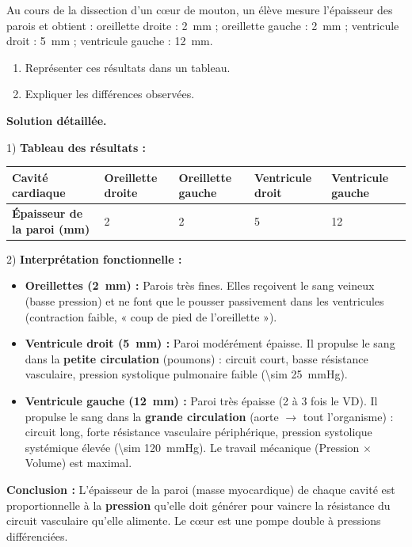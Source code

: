 \documentclass[11pt]{article}
\begin{document}
\begin{exoresolu}
Au cours de la dissection d'un cœur de mouton, un élève mesure l'épaisseur des parois et obtient : oreillette droite : \SI{2}{mm} ; oreillette gauche : \SI{2}{mm} ; ventricule droit : \SI{5}{mm} ; ventricule gauche : \SI{12}{mm}.
\begin{enumerate}
\item Représenter ces résultats dans un tableau.
\item Expliquer les différences observées.
\end{enumerate}
\tcblower
\textbf{Solution détaillée.}

1) \textbf{Tableau des résultats :}
\begin{center}
\begin{tabularx}{\linewidth}{|l|X|X|X|X|}
\hline
\rowcolor{popblueL} \textbf{Cavité cardiaque} & Oreillette droite & Oreillette gauche & Ventricule droit & Ventricule gauche \\
\hline
\textbf{Épaisseur de la paroi (mm)} & 2 & 2 & 5 & 12 \\
\hline
\end{tabularx}
\end{center}

2) \textbf{Interprétation fonctionnelle :}
\begin{itemize}
\item \textbf{Oreillettes (\SI{2}{mm}) :} Parois très fines. Elles reçoivent le sang veineux (basse pression) et ne font que le pousser passivement dans les ventricules (contraction faible, « coup de pied de l'oreillette »).
\item \textbf{Ventricule droit (\SI{5}{mm}) :} Paroi modérément épaisse. Il propulse le sang dans la \textbf{petite circulation} (poumons) : circuit court, basse résistance vasculaire, pression systolique pulmonaire faible (\SI{\sim 25}{mmHg}).
\item \textbf{Ventricule gauche (\SI{12}{mm}) :} Paroi très épaisse (2 à 3 fois le VD). Il propulse le sang dans la \textbf{grande circulation} (aorte $\rightarrow$ tout l'organisme) : circuit long, forte résistance vasculaire périphérique, pression systolique systémique élevée (\SI{\sim 120}{mmHg}). Le travail mécanique (Pression $\times$ Volume) est maximal.
\end{itemize}
\textbf{Conclusion :} L'épaisseur de la paroi (masse myocardique) de chaque cavité est proportionnelle à la \textbf{pression} qu'elle doit générer pour vaincre la résistance du circuit vasculaire qu'elle alimente. Le cœur est une pompe double à pressions différenciées.
\end{exoresolu}
\end{document}
